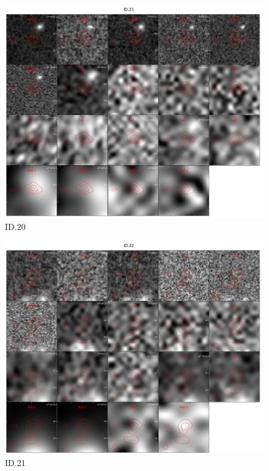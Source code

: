 \begin{figure}[tbp]
\centering \includegraphics[width=120mm]{Matched/ASPECS_Cutout_20.jpg}
\caption{ID.20}
\label{fig:Match_Three}
\end{figure}

\begin{figure}[tbp]
\centering \includegraphics[width=120mm]{Matched/ASPECS_Cutout_21.jpg}
\caption{ID.21}
\label{fig:Match_Three}
\end{figure}

